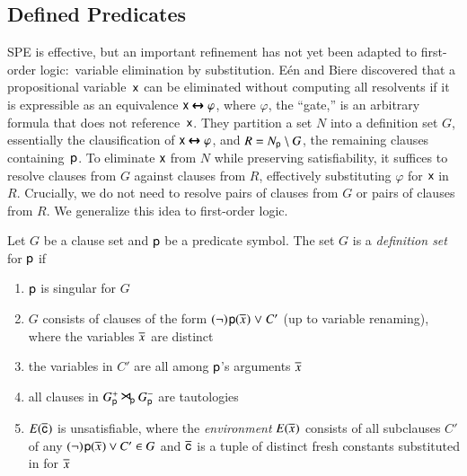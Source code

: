 \subsection{Defined Predicates}

SPE is effective, but an important refinement has not yet been adapted to
first-order logic:\ variable elimination by substitution. E{\'{e}}n and Biere
\cite{eb-2005-satpreprocess} discovered that a propositional variable~$\mathsf{x}$ can be
eliminated without computing all resolvents if it is expressible as an
equivalence $\mathsf{x} \pmb{\leftrightarrow} \varphi$, where $\varphi$, the ``gate,''
is an arbitrary formula that does not reference~$\mathsf{x}$.
They partition a set $N$
into a definition set $G$, essentially the
clausification of $\mathsf{x} \pmb{\leftrightarrow} \varphi$, and
$R = N_{\mathsf{p}} \setminus G$, the remaining
clauses containing~$\mathsf{p}$. To eliminate $\mathsf{x}$ from $N$ while
preserving satisfiability, it suffices to resolve clauses from $G$ against
clauses from $R$, effectively substituting $\varphi$ for $\mathsf{x}$ in $R$.
Crucially, we do not need to resolve pairs of clauses from $G$
or pairs of clauses from $R$.
We generalize this idea to first-order logic.

\begin{defi}
   \label{def:definition}
   Let $G$ be a clause set and $\mathsf{p}$ be a predicate symbol.
%
   The set $G$ is a \emph{definition set} for $\mathsf{p}$ if
   \begin{enumerate}
      \item $\mathsf{p}$ is singular for $G$
      \item $G$ consists of clauses of the form
      $(\neg)\kern.2ex{\mathsf{p}(\overline{x}_{})} \mathrel{\lor} C'$ (up to variable renaming),
      where the variables $\overline{x}_{}$ are distinct
      \item the
      variables in $C'$ are all among $\mathsf{p}$'s arguments $\overline{x}_{}$
      \item all clauses in $G^+_{\mathsf{p}}
      \mathbin{\smash{\hbox{\Large$\kern-.1ex\rtimes$}}}_{\!\mathsf{p}} G^-_{\mathsf{p}}$ are tautologies
      \item $E(\overline{\mathsf{c}}_{})$ is unsatisfiable, where
      the \emph{environment} $E(\overline{x}_{})$ consists of all subclauses $C'$ of any
      $(\neg)\kern.2ex{\mathsf{p}(\overline{x}_{})} \mathbin{\mathrel{\lor}} C' \in G$ and
      $\overline{\mathsf{c}}_{}$ is a tuple of distinct fresh constants substituted
      in for $\overline{x}_{}$
   \end{enumerate}
\end{defi}

